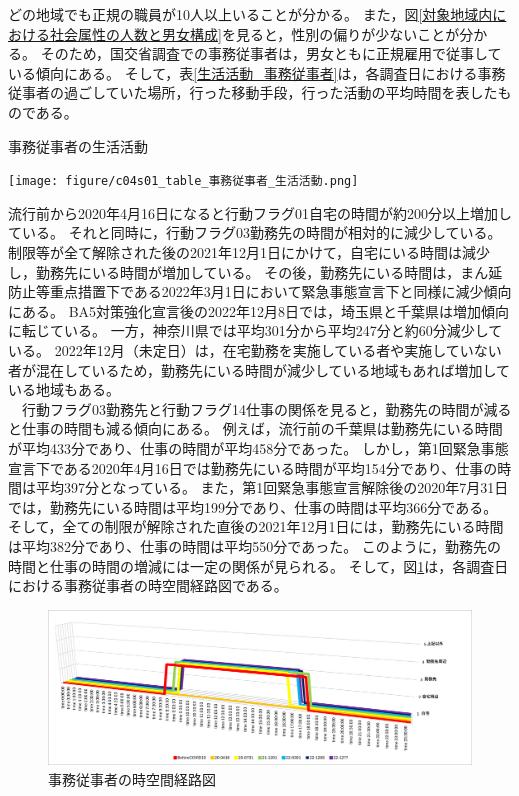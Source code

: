 \documentclass[paper={210mm,297mm},line_length=35zw,number_of_lines=31,head_space=30mm,gutter=40mm,baselineskip=2.0zw,headfoot_verticalposition=1.5zw]{jlreq}
\begin{document}
どの地域でも正規の職員が10人以上いることが分かる。
また，図\ref{対象地域内における社会属性の人数と男女構成}を見ると，性別の偏りが少ないことが分かる。
そのため，国交省調査での事務従事者は，男女ともに正規雇用で従事している傾向にある。
そして，表\ref{生活活動_事務従事者}は，各調査日における事務従事者の過ごしていた場所，行った移動手段，行った活動の平均時間を表したものである。\\

\begin{table}[H]
  \centering
  \caption{事務従事者の生活活動}
  \texttt{[image: figure/c04s01\_table\_事務従事者\_生活活動.png]}
  \label{生活活動_事務従事者}
\end{table}

流行前から2020年4月16日になると行動フラグ01自宅の時間が約200分以上増加している。
それと同時に，行動フラグ03勤務先の時間が相対的に減少している。
制限等が全て解除された後の2021年12月1日にかけて，自宅にいる時間は減少し，勤務先にいる時間が増加している。
その後，勤務先にいる時間は，まん延防止等重点措置下である2022年3月1日において緊急事態宣言下と同様に減少傾向にある。
BA5対策強化宣言後の2022年12月8日では，埼玉県と千葉県は増加傾向に転じている。
一方，神奈川県では平均301分から平均247分と約60分減少している。
2022年12月（未定日）は，在宅勤務を実施している者や実施していない者が混在しているため，勤務先にいる時間が減少している地域もあれば増加している地域もある。\\
　行動フラグ03勤務先と行動フラグ14仕事の関係を見ると，勤務先の時間が減ると仕事の時間も減る傾向にある。
例えば，流行前の千葉県は勤務先にいる時間が平均433分であり、仕事の時間が平均458分であった。
しかし，第1回緊急事態宣言下である2020年4月16日では勤務先にいる時間が平均154分であり、仕事の時間は平均397分となっている。
また，第1回緊急事態宣言解除後の2020年7月31日では，勤務先にいる時間は平均199分であり、仕事の時間は平均366分である。
そして，全ての制限が解除された直後の2021年12月1日には，勤務先にいる時間は平均382分であり、仕事の時間は平均550分であった。
このように，勤務先の時間と仕事の時間の増減には一定の関係が見られる。
そして，図\ref{時空間経路図_事務従事者}は，各調査日における事務従事者の時空間経路図である。\\

\begin{figure}[H]
  \centering
  \includegraphics[scale=0.4]{figure/c04s01_fig_事務従事者_時空間経路図.png}
  \caption{事務従事者の時空間経路図}
  \label{時空間経路図_事務従事者}
\end{figure}
\end{document}
